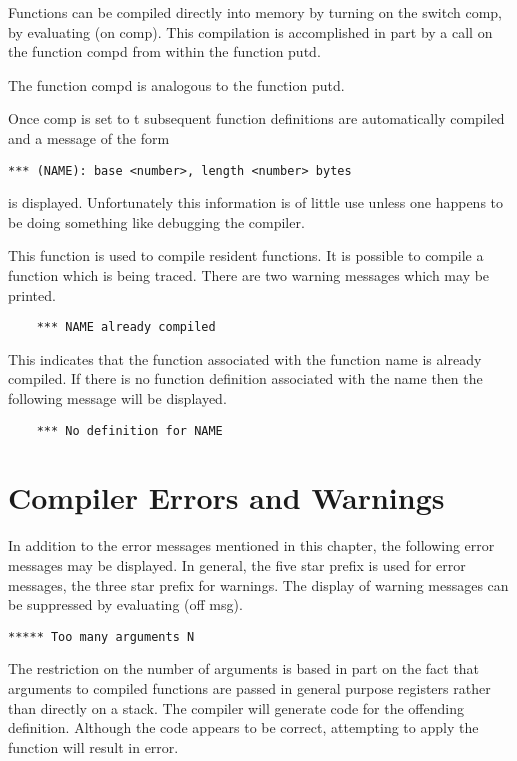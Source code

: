   Functions can be compiled directly into memory by  turning  on
the  switch  comp,  by evaluating (on comp). This compilation is
accomplished in part by a call on the function compd from within
the function putd.


{    The function compd is analogous to the  function  putd.  }

  Once  comp  is  set  to  t subsequent function definitions are
automatically compiled and a message of the form

\begin{verbatim}
*** (NAME): base <number>, length <number> bytes
\end{verbatim}
is displayed. Unfortunately this information is  of  little  use
unless  one  happens  to  be  doing something like debugging the
compiler.


{    This function is used to compile resident functions.  It  is
    possible  to compile a function which is being traced. There
    are two warning messages which may be printed.
}
\begin{verbatim}
    *** NAME already compiled
\end{verbatim}
    This  indicates  that  the  function  associated  with   the
    function  name is already compiled.  If there is no function
    definition associated  with  the  name  then  the  following
    message will be displayed.

\begin{verbatim}
    *** No definition for NAME
\end{verbatim}

\section{Compiler Errors and Warnings}

  In  addition  to the error messages mentioned in this chapter,
the following error messages may be displayed. In  general,  the
five  star  prefix  is  used  for error messages, the three star
prefix for warnings.  The display of  warning  messages  can  be
suppressed by evaluating (off msg).

\begin{verbatim}
***** Too many arguments N
\end{verbatim}
The  restriction  on the number of arguments is based in part on
the fact that arguments to  compiled  functions  are  passed  in
general  purpose  registers rather than directly on a stack. The
compiler  will  generate  code  for  the  offending  definition.
Although the code appears to be correct, attempting to apply the
function will result in error.

